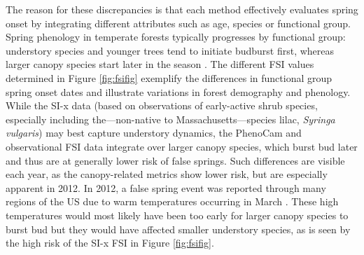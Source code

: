 \documentclass{article}\usepackage[]{graphicx}\usepackage[]{color}
\begin{document}
The reason for these discrepancies is that each method effectively evaluates spring onset by integrating different attributes such as age, species or functional group. Spring phenology in temperate forests typically progresses by functional group: understory species and younger trees tend to initiate budburst first, whereas larger canopy species start later in the season \citep{Richardson2009, Xin2016}. The different FSI values determined in Figure \ref{fig:fsifig} exemplify the differences in functional group spring onset dates and illustrate variations in forest demography and phenology. While the SI-x data (based on observations of early-active shrub species, especially including the---non-native to Massachusetts---species lilac, \emph{Syringa vulgaris}) may best capture understory dynamics, the PhenoCam and observational FSI data integrate over larger canopy species, which burst bud later and thus are at generally lower risk of false springs. Such differences are visible each year, as the canopy-related metrics show lower risk, but are especially apparent in 2012. In 2012, a false spring event was reported through many regions of the US due to warm temperatures occurring in March \citep{Ault2015}. These high temperatures would most likely have been too early for larger canopy species to burst bud but they would have affected smaller understory species, as is seen by the high risk of the SI-x FSI in Figure \ref{fig:fsifig}. 
\end{document}
